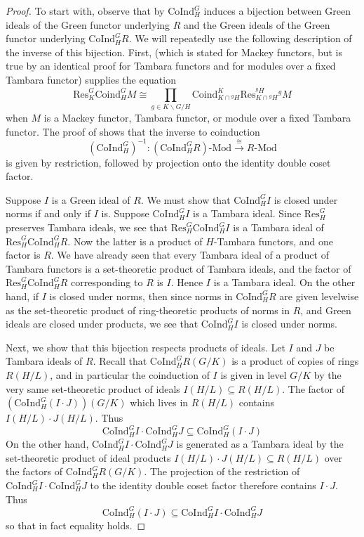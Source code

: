 \documentclass[11pt,dvipsnames]{amsart}
\theoremstyle{BoldRemark}
\newcommand{\Coind}{\mathrm{CoInd}}
\renewcommand{\subset}{\subseteq}
\newcommand{\Mod}{\mathrm{Mod}}
\begin{document}
\begin{proof}
	To start with, observe that by \cite[Theorem F]{Wis25a} $\Coind_H^G$ induces a bijection between Green ideals of the Green functor underlying $R$ and the Green ideals of the Green functor underlying $\Coind_H^G R$. We will repeatedly use the following description of the inverse of this bijection. First, \cite[Proposition 5.3]{TW95} (which is stated for Mackey functors, but is true by an identical proof for Tambara functors and for modules over a fixed Tambara functor) supplies the equation 
    \[ 
	   \mathrm{Res}_K^G \mathrm{Coind}_H^G M \cong \prod_{g \in K \backslash G / H} \mathrm{Coind}_{K \cap {}^g H}^K \mathrm{Res}_{K \cap {}^g H}^{{}^g H} {}^g M 
    \] 
    when $M$ is a Mackey functor, Tambara functor, or module over a fixed Tambara functor. The proof of \cite[Theorem F]{Wis25a} shows that the inverse to coinduction
    \[ 
        (\Coind_H^G)^{-1} : (\Coind_H^G R) \text{-} \Mod \xrightarrow{\cong} R \text{-} \Mod 
    \] 
    is given by restriction, followed by projection onto the identity double coset factor.
	
	Suppose $I$ is a Green ideal of $R$. We must show that $\Coind_H^G I$ is closed under norms if and only if $I$ is. Suppose $\Coind_H^G I$ is a Tambara ideal. Since $\mathrm{Res}_H^G$ preserves Tambara ideals, we see that $\mathrm{Res}_H^G \Coind_H^G I$ is a Tambara ideal of $\mathrm{Res}_H^G \Coind_H^G R$. Now the latter is a product of $H$-Tambara functors, and one factor is $R$. We have already seen that every Tambara ideal of a product of Tambara functors is a set-theoretic product of Tambara ideals, and the factor of $\mathrm{Res}_H^G \Coind_H^G R$ corresponding to $R$ is $I$. Hence $I$ is a Tambara ideal. On the other hand, if $I$ is closed under norms, then since norms in $\Coind_H^G R$ are given levelwise as the set-theoretic product of ring-theoretic products of norms in $R$, and Green ideals are closed under products, we see that $\Coind_H^G I$ is closed under norms.
	
	Next, we show that this bijection respects products of ideals. Let $I$ and $J$ be Tambara ideals of $R$. Recall that $\Coind_H^G R(G/K)$ is a product of copies of rings $R(H/L)$, and in particular the coinduction of $I$ is given in level $G/K$ by the very same set-theoretic product of ideals $I(H/L) \subset R(H/L)$. The factor of $( \Coind_H^G ( I \cdot J ))(G/K)$ which lives in $R(H/L)$ contains $I(H/L) \cdot J(H/L)$. Thus 
    \[ 
        \Coind_H^G I \cdot \Coind_H^G J \subset \Coind_H^G ( I \cdot J ) 
    \]
    On the other hand, $\Coind_H^G I \cdot \Coind_H^G J$ is generated as a Tambara ideal by the set-theoretic product of ideal products $I(H/L) \cdot J(H/L) \subset R(H/L)$ over the factors of $\Coind_H^G R(G/K)$. The projection of the restriction of $\Coind_H^G I \cdot \Coind_H^G J$ to the identity double coset factor therefore contains $I \cdot J$. Thus 
    \[
        \Coind_H^G ( I \cdot J ) \subset \Coind_H^G I \cdot \Coind_H^G J 
    \] 
    so that in fact equality holds.


\end{proof}
\end{document}
